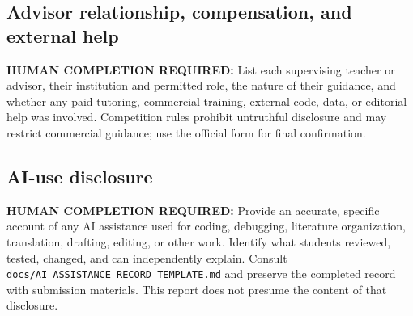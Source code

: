 \subsection*{Advisor relationship, compensation, and external help}
\textbf{HUMAN COMPLETION REQUIRED:} List each supervising teacher or advisor,
their institution and permitted role, the nature of their guidance, and whether
any paid tutoring, commercial training, external code, data, or editorial help
was involved. Competition rules prohibit untruthful disclosure and may restrict
commercial guidance; use the official form for final confirmation.

\subsection*{AI-use disclosure}
\textbf{HUMAN COMPLETION REQUIRED:} Provide an accurate, specific account of
any AI assistance used for coding, debugging, literature organization,
translation, drafting, editing, or other work. Identify what students reviewed,
tested, changed, and can independently explain. Consult
\texttt{docs/AI\_ASSISTANCE\_RECORD\_TEMPLATE.md} and preserve the completed
record with submission materials. This report does not presume the content of
that disclosure.
